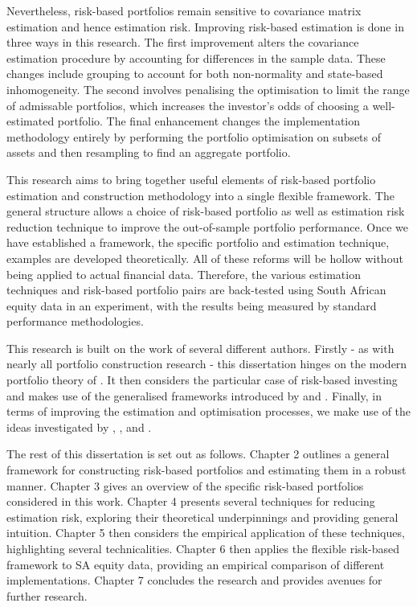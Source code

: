 \documentclass[a4paper,11pt,nocenter,bold,noupper,headcount]{mythesis}
\theoremstyle{plain}
\theoremstyle{definition}
\begin{document}
Nevertheless, risk-based portfolios remain sensitive to covariance matrix estimation and hence estimation risk. Improving risk-based estimation is done in three ways in this research. The first improvement alters the covariance estimation procedure by accounting for differences in the sample data. These changes include grouping to account for both non-normality and state-based inhomogeneity. The second involves penalising the optimisation to limit the range of admissable portfolios, which increases the investor's odds of choosing a well-estimated portfolio. The final enhancement changes the implementation methodology entirely by performing the portfolio optimisation on subsets of assets and then resampling to find an aggregate portfolio.

This research aims to bring together useful elements of risk-based portfolio estimation and construction methodology into a single flexible framework. The general structure allows a choice of risk-based portfolio as well as estimation risk reduction technique to improve the out-of-sample portfolio performance. Once we have established a framework, the specific portfolio and estimation technique, examples are developed theoretically. All of these reforms will be hollow without being applied to actual financial data. Therefore, the various estimation techniques and risk-based portfolio pairs are back-tested using South African equity data in an experiment, with the results being measured by standard performance methodologies.


This research is built on the work of several different authors. Firstly - as with nearly all portfolio construction research - this dissertation hinges on the modern portfolio theory of \cite{M52}. It then considers the particular case of risk-based investing and makes use of the generalised frameworks introduced by \cite{J13} and \cite{RR15}. Finally, in terms of improving the estimation and optimisation processes, we make use of the ideas investigated by \cite{FD18}, \cite{K18}, and \cite{SW17}.

The rest of this dissertation is set out as follows. Chapter 2 outlines a general framework for constructing risk-based portfolios and estimating them in a robust manner. Chapter 3 gives an overview of the specific risk-based portfolios considered in this work. Chapter 4 presents several techniques for reducing estimation risk, exploring their theoretical underpinnings and providing general intuition. Chapter 5 then considers the empirical application of these techniques, highlighting several technicalities. Chapter 6 then applies the flexible risk-based framework to SA equity data, providing an empirical comparison of different implementations. Chapter 7 concludes the research and provides avenues for further research.
\end{document}

